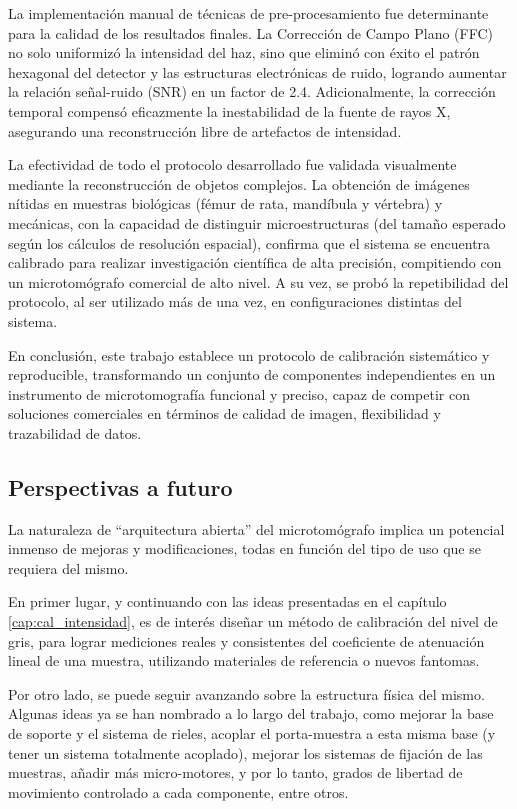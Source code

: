 La implementación manual de técnicas de
pre-procesamiento fue determinante para la calidad de los resultados finales. La Corrección
de Campo Plano (FFC) no solo uniformizó la intensidad del haz, sino que eliminó con éxito el
patrón hexagonal del detector y las estructuras electrónicas de ruido, logrando aumentar la
relación señal-ruido (SNR) en un factor de 2.4. Adicionalmente, la corrección temporal compensó
eficazmente la inestabilidad de la fuente de rayos X, asegurando una reconstrucción libre
de artefactos de intensidad.

La efectividad de todo el protocolo desarrollado
fue validada visualmente mediante la reconstrucción de objetos complejos. La obtención de
imágenes nítidas en muestras biológicas (fémur de rata, mandíbula y vértebra) y mecánicas, con la
capacidad de distinguir microestructuras (del tamaño esperado según los cálculos de resolución
espacial), confirma que el sistema se encuentra
calibrado para realizar investigación científica de alta precisión, compitiendo con un
microtomógrafo comercial de alto nivel. A su vez, se probó la
repetibilidad del protocolo, al ser utilizado más de una vez, en configuraciones distintas del
sistema.

En conclusión, este trabajo establece un protocolo de calibración sistemático y reproducible,
transformando un conjunto de componentes independientes en un instrumento de microtomografía
funcional y preciso, capaz de competir con soluciones comerciales en términos de calidad de imagen,
flexibilidad y trazabilidad de datos.

\subsection{Perspectivas a futuro}

La naturaleza de ``arquitectura abierta'' del microtomógrafo implica un potencial inmenso de
mejoras y modificaciones, todas en función del tipo de uso que se requiera del mismo.

En primer lugar, y continuando con las ideas presentadas en el capítulo \ref{cap:cal_intensidad},
es de interés diseñar un método de calibración del nivel de gris, para lograr mediciones reales
y consistentes del coeficiente de atenuación lineal de una muestra, utilizando materiales de
referencia o nuevos fantomas.

Por otro lado, se puede seguir avanzando sobre la estructura física del mismo. Algunas ideas
ya se han nombrado a lo largo del trabajo, como mejorar la base de soporte y el sistema de rieles, acoplar
el porta-muestra a esta misma base (y tener un sistema totalmente acoplado), mejorar los sistemas de
fijación de las muestras, añadir más micro-motores,
y por lo tanto, grados de libertad de movimiento controlado a cada componente, entre otros.

